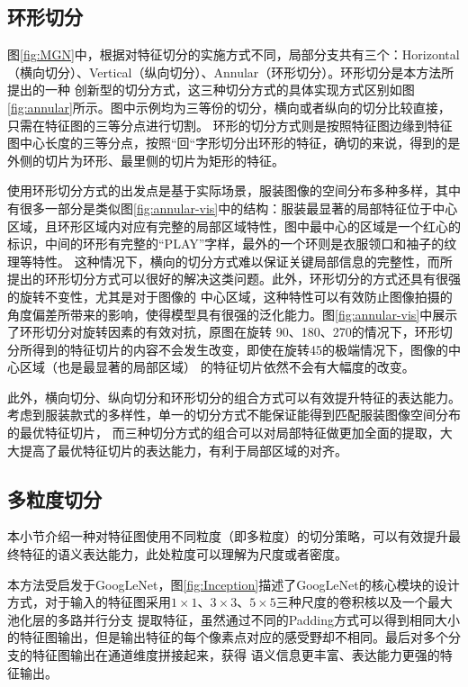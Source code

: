 \subsection{环形切分}
图\ref{fig:MGN}中，根据对特征切分的实施方式不同，局部分支共有三个：Horizontal（横向切分）、Vertical（纵向切分）、Annular（环形切分）。环形切分是本方法所提出的一种
创新型的切分方式，这三种切分方式的具体实现方式区别如图\ref{fig:annular}所示。图中示例均为三等份的切分，横向或者纵向的切分比较直接，只需在特征图的三等分点进行切割。
环形的切分方式则是按照特征图边缘到特征图中心长度的三等分点，按照“回“字形切分出环形的特征，确切的来说，得到的是外侧的切片为环形、最里侧的切片为矩形的特征。


使用环形切分方式的出发点是基于实际场景，服装图像的空间分布多种多样，其中有很多一部分是类似图\ref{fig:annular-vis}中的结构：服装最显著的局部特征位于中心区域，且环形区域内对应有完整的局部区域特性，图中最中心的区域是一个红心的标识，中间的环形有完整的“PLAY”字样，最外的一个环则是衣服领口和袖子的纹理等特性。
这种情况下，横向的切分方式难以保证关键局部信息的完整性，而所提出的环形切分方式可以很好的解决这类问题。此外，环形切分的方式还具有很强的旋转不变性，尤其是对于图像的
中心区域，这种特性可以有效防止图像拍摄的角度偏差所带来的影响，使得模型具有很强的泛化能力。图\ref{fig:annular-vis}中展示了环形切分对旋转因素的有效对抗，原图在旋转
90\degree、180\degree、270\degree 的情况下，环形切分所得到的特征切片的内容不会发生改变，即使在旋转45\degree 的极端情况下，图像的中心区域（也是最显著的局部区域）
的特征切片依然不会有大幅度的改变。


此外，横向切分、纵向切分和环形切分的组合方式可以有效提升特征的表达能力。考虑到服装款式的多样性，单一的切分方式不能保证能得到匹配服装图像空间分布的最优特征切片，
而三种切分方式的组合可以对局部特征做更加全面的提取，大大提高了最优特征切片的表达能力，有利于局部区域的对齐。
\subsection{多粒度切分}
本小节介绍一种对特征图使用不同粒度（即多粒度）的切分策略，可以有效提升最终特征的语义表达能力，此处粒度可以理解为尺度或者密度。


本方法受启发于GoogLeNet，图\ref{fig:Inception}描述了GoogLeNet的核心模块的设计方式，对于输入的特征图采用$1 \times 1$、$3 \times 3$、$5 \times 5$三种尺度的卷积核以及一个最大池化层的多路并行分支
提取特征，虽然通过不同的Padding方式可以得到相同大小的特征图输出，但是输出特征的每个像素点对应的感受野却不相同。最后对多个分支的特征图输出在通道维度拼接起来，获得
语义信息更丰富、表达能力更强的特征输出。


